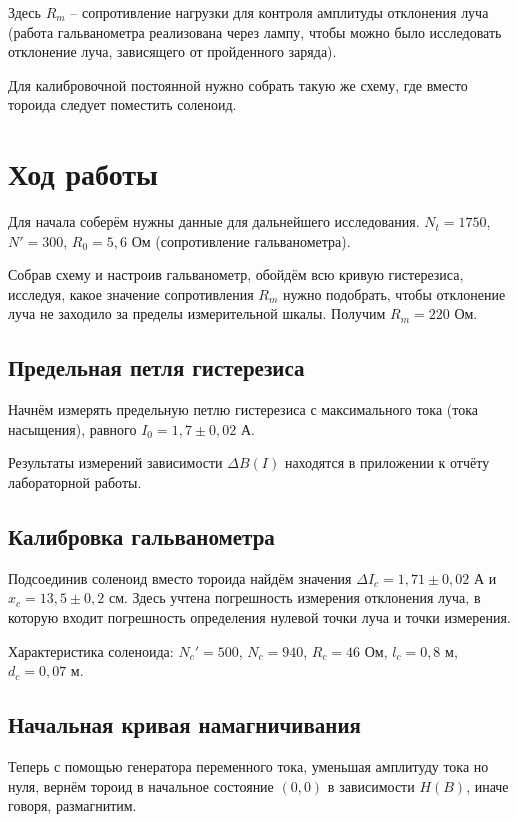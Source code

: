 Здесь $R_m$ -- сопротивление нагрузки для контроля амплитуды отклонения луча (работа гальванометра реализована через лампу, чтобы можно было исследовать отклонение луча, зависящего от пройденного заряда).

Для калибровочной постоянной нужно собрать такую же схему, где вместо тороида следует поместить соленоид.


\section{Ход работы}

Для начала соберём нужны данные для дальнейшего исследования. $N_t = 1750$, $N' = 300$, $R_0 = 5,6$ Ом (сопротивление гальванометра).

Собрав схему и настроив гальванометр, обойдём всю кривую гистерезиса, исследуя, какое значение сопротивления $R_m$ нужно подобрать, чтобы отклонение луча не заходило за пределы измерительной шкалы. Получим $R_m = 220$ Ом.

\subsection{Предельная петля гистерезиса}

Начнём измерять предельную петлю гистерезиса с максимального тока (тока насыщения), равного $I_0 = 1,7 \pm 0,02$ А. 

Результаты измерений зависимости $\Delta B(I)$ находятся в приложении к отчёту лабораторной работы.

\subsection{Калибровка гальванометра}  

Подсоединив соленоид вместо тороида найдём значения $\Delta I_c = 1,71 \pm 0,02$ А и $x_c = 13,5 \pm 0,2$ см. Здесь учтена погрешность измерения отклонения луча, в которую входит погрешность определения нулевой точки луча и точки измерения.

Характеристика соленоида: $N_c' = 500$, $N_c = 940$, $R_c = 46$ Ом, $l_c = 0,8$ м, $d_c= 0,07$ м.

\subsection{Начальная кривая намагничивания} 

Теперь с помощью генератора переменного тока, уменьшая амплитуду тока но нуля, вернём тороид в начальное состояние $(0,0)$ в зависимости $H(B)$, иначе говоря, размагнитим.

